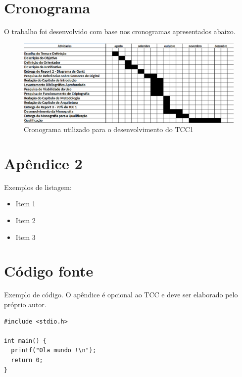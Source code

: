 \documentclass[
	12pt,				%
	openright,			%
	oneside,			%
	a4paper,			%
	chapter=TITLE,		%
	section=TITLE,		%
	english,			%
	french,				%
	spanish,			%
	brazil				%
	]{abntex2}
\begin{document}
\begin{apendicesenv}
\captionsetup[figure]{list=no}
\chapter{Cronograma}
	\setcounter{figure}{0} %
	O trabalho foi desenvolvido com base nos cronogramas apresentados abaixo.
	\begin{figure}[H]
  		\begin{center}
    		\caption{Cronograma utilizado para o desenvolvimento do TCC1}
    		\label{cronograma1}
    		\includegraphics [scale=0.4]{imagens/cronograma1.png}
  		\end{center}
	\end{figure}

\chapter{Apêndice 2}
	Exemplos de listagem:
	
	\begin{itemize}  
		\item Item 1
		\item Item 2
		\item Item 3
	\end{itemize}


\chapter{Código fonte}

	Exemplo de código. O apêndice é opcional ao TCC e deve ser elaborado pelo próprio autor.

\scriptsize
\begin{lstlisting}
#include <stdio.h>

int main() {
  printf("Ola mundo !\n");
  return 0;
}
\end{lstlisting}

\end{apendicesenv}
\end{document}
